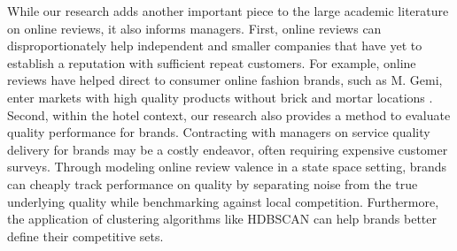 \documentclass{informs_mod} %
\begin{document}
While our research adds another important piece to the large academic literature on online reviews, it also informs managers. First, online reviews can disproportionately help independent and smaller companies that have yet to establish a reputation with sufficient repeat customers. For example, online reviews have helped direct to consumer online fashion brands, such as M. Gemi, enter markets with high quality products without brick and mortar locations . Second, within the hotel context, our research also provides a method to evaluate quality performance for brands. Contracting with managers on service quality delivery for brands may be a costly endeavor, often requiring expensive customer surveys. Through modeling online review valence in a state space setting, brands can cheaply track performance on quality by separating noise from the true underlying quality while benchmarking against local competition. Furthermore, the application of clustering algorithms like HDBSCAN can help brands better define their competitive sets. 
\end{document}
